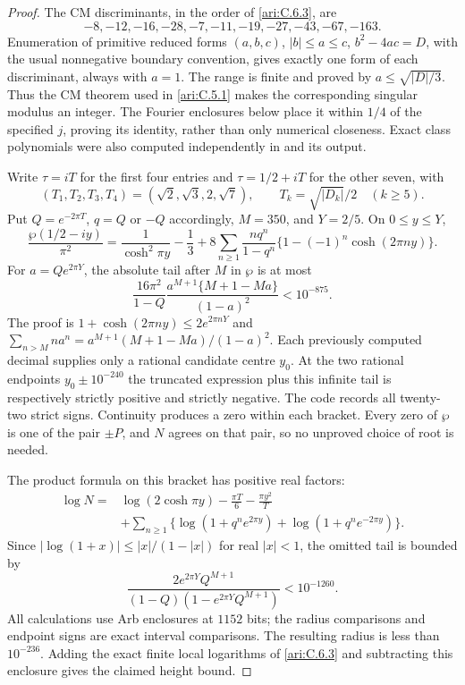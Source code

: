 \begin{proof}
The CM discriminants, in the order of \ref{ari:C.6.3}, are
\[
 -8,-12,-16,-28,-7,-11,-19,-27,-43,-67,-163.
\]
Enumeration of primitive reduced forms
$(a,b,c)$, $|b|\le a\le c$, $b^2-4ac=D$, with the usual
nonnegative boundary convention, gives exactly one form of
each discriminant, always with $a=1$.
The range is finite and proved by $a\le\sqrt{|D|/3}$.
Thus the CM theorem used in \ref{ari:C.5.1} makes the corresponding
singular modulus an integer. The Fourier enclosures below
place it within $1/4$ of the specified $j$, proving its
identity, rather than only numerical closeness. Exact class
polynomials were also computed independently in
 and its output.

Write $\tau=iT$ for the first four entries and
$\tau=1/2+iT$ for the other seven, with
\[
 (T_1,T_2,T_3,T_4)=(\sqrt2,\sqrt3,2,\sqrt7),\qquad
 T_k=\sqrt{|D_k|}/2\quad(k\ge5).
\]
Put $Q=e^{-2\pi T}$, $q=Q$ or $-Q$ accordingly,
$M=350$, and $Y=2/5$. On $0\le y\le Y$,
\begin{equation}\label{ari:eq:ch-wp-bracket}
 \frac{\wp(1/2-iy)}{\pi^2}
 =\frac1{\cosh^2\pi y}-\frac13+
 8\sum_{n\ge1}\frac{nq^n}{1-q^n}
                 \{1-(-1)^n\cosh(2\pi ny)\}.
\end{equation}
For $a=Qe^{2\pi Y}$, the absolute tail after $M$ in
$\wp$ is at most
\[
 \frac{16\pi^2}{1-Q}
 \frac{a^{M+1}\{M+1-Ma\}}{(1-a)^2}<10^{-875}.
\]
The proof is $1+\cosh(2\pi ny)\le2e^{2\pi nY}$ and
$\sum_{n>M}na^n=a^{M+1}(M+1-Ma)/(1-a)^2$.
Each previously computed decimal supplies only a rational
candidate centre $y_0$. At the two rational endpoints
$y_0\pm10^{-240}$ the truncated expression plus this
infinite tail is respectively strictly positive and strictly
negative. The code records all twenty-two strict signs.
Continuity produces a zero within each bracket. Every zero
of $\wp$ is one of the pair $\pm P$, and $N$ agrees on
that pair, so no unproved choice of root is needed.

The product formula on this bracket has positive real factors:
\begin{align*}
 \log N={}&\log(2\cosh\pi y)-\frac{\pi T}{6}
                      -\frac{\pi y^2}{T}\\
 &+\sum_{n\ge1}\{\log(1+q^ne^{2\pi y})
                         +\log(1+q^ne^{-2\pi y})\}.
\end{align*}
Since $|\log(1+x)|\le |x|/(1-|x|)$ for real $|x|<1$,
the omitted tail is bounded by
\[
 \frac{2e^{2\pi Y}Q^{M+1}}
 {(1-Q)(1-e^{2\pi Y}Q^{M+1})}<10^{-1260}.
\]
All calculations use Arb enclosures at $1152$ bits; the
radius comparisons and endpoint signs are exact interval
comparisons. The resulting radius is less than $10^{-236}$.
Adding the exact finite local logarithms of \ref{ari:C.6.3} and
subtracting this enclosure gives the claimed height bound.


\end{proof}
